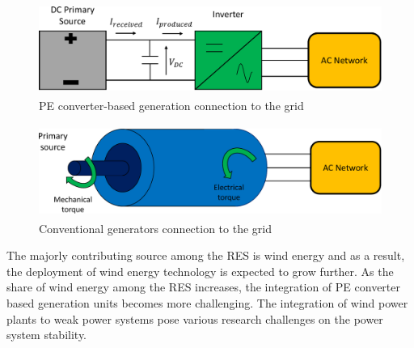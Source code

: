 \begin{figure}[H]
\centering
    \includegraphics[height = 3cm,width = 12cm]{Diagrams/Chapter_1/Energy_conv_system_2.pdf}
    \caption{PE converter-based generation connection to the grid \cite{denis_migrate_2018}}
    \label{fig:Energy_conv_system_2}
\end{figure}
\vspace{0mm}
\begin{figure}[H]
\centering
    \includegraphics[height = 3cm,width = 12.5cm]{Diagrams/Chapter_1/Energy_conv_system.pdf}
    \caption{Conventional generators connection to the grid \cite{denis_migrate_2018}}
    \label{fig:Energy_conv_system}
\end{figure}

The majorly contributing source among the \gls{RES} is wind energy and as a result, the deployment of wind energy technology is expected to grow further. As the share of wind energy among the \gls{RES} increases, the integration of \gls{PE} converter based generation units becomes more challenging. The integration of wind power plants to weak power systems pose various research challenges on the power system stability. 


